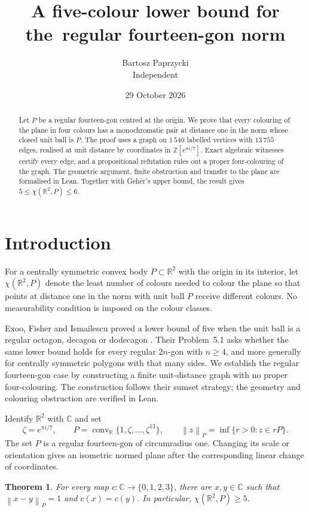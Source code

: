 \documentclass[11pt,a4paper]{article}
\title{A five-colour lower bound for the\ regular fourteen-gon norm}
\author{Bartosz Paprzycki\\[3pt]\small Independent}
\date{29 October 2026}
\newtheorem{theorem}{Theorem}
\theoremstyle{remark}
\newcommand{\C}{\mathbb C}
\newcommand{\R}{\mathbb R}
\newcommand{\Z}{\mathbb Z}
\newcommand{\pn}[1]{\left\lVert #1\right\rVert_{P}}
\newcommand{\conv}{\operatorname{conv}}
\begin{document}
\maketitle
\begin{abstract}
Let $P$ be a regular fourteen-gon centred at the origin. We prove that
every colouring of the plane in four colours has a monochromatic pair
at distance one in the norm whose closed unit ball is $P$.
The proof uses a graph on $1\,540$ labelled vertices with $13\,755$ edges,
realised at unit distance by coordinates in $\Z[e^{\pi i/7}]$.
Exact algebraic witnesses certify every edge, and a propositional
refutation rules out a proper four-colouring of the graph.
The geometric argument, finite obstruction and transfer to the plane
are formalised in Lean. Together with Geh\'er's upper bound, the result
gives $5\leq\chi(\R^2,P)\leq6$.
\end{abstract}

\section{Introduction}

For a centrally symmetric convex body $P\subset\R^2$ with the origin in
its interior, let $\chi(\R^2,P)$ denote the least number of colours needed
to colour the plane so that points at distance one in the norm with
unit ball $P$ receive different colours. No measurability condition is
imposed on the colour classes.

Exoo, Fisher and Ismailescu proved a lower bound of five when the unit
ball is a regular octagon, decagon or dodecagon
\cite{efi}. Their Problem~5.1 asks whether the same lower bound holds
for every regular $2n$-gon with $n\geq4$, and more generally for centrally
symmetric polygons with that many sides. We establish the regular
fourteen-gon case by constructing a finite unit-distance graph with no
proper four-colouring. The construction follows their sumset strategy;
the geometry and colouring obstruction are verified in Lean.

Identify $\R^2$ with $\C$ and set
\[
 \zeta=e^{\pi i/7},\qquad
 P=\conv_{\R}\{1,\zeta,\ldots,\zeta^{13}\},\qquad
 \pn{z}=\inf\{r>0:z\in rP\}.
\]
The set $P$ is a regular fourteen-gon of circumradius one. Changing its
scale or orientation gives an isometric normed plane after the
corresponding linear change of coordinates.

\begin{theorem}\label{thm:main}
For every map $c:\C\to\{0,1,2,3\}$, there are $x,y\in\C$ such that
$\pn{x-y}=1$ and $c(x)=c(y)$. In particular,
$\chi(\R^2,P)\geq5$.
\end{theorem}
\end{document}
